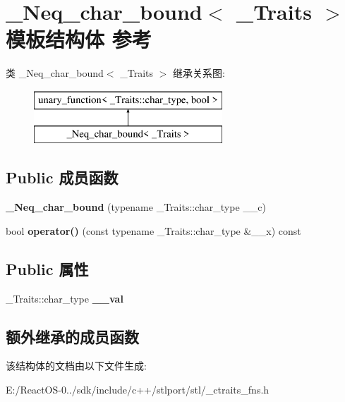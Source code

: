 \hypertarget{struct___neq__char__bound}{}\section{\+\_\+\+Neq\+\_\+char\+\_\+bound$<$ \+\_\+\+Traits $>$ 模板结构体 参考}
\label{struct___neq__char__bound}
类 \+\_\+\+Neq\+\_\+char\+\_\+bound$<$ \+\_\+\+Traits $>$ 继承关系图\+:\begin{figure}[H]
\begin{center}
\leavevmode
\includegraphics[height=2.000000cm]{struct___neq__char__bound}
\end{center}
\end{figure}
\subsection*{Public 成员函数}
\begin{DoxyCompactItemize}
\item 
\mbox{\label{struct___neq__char__bound_a9af7582cceb19b5851cd2db854e11588}} 
{\bfseries \+\_\+\+Neq\+\_\+char\+\_\+bound} (typename \+\_\+\+Traits\+::char\+\_\+type \+\_\+\+\_\+c)
\item 
\mbox{\label{struct___neq__char__bound_a248cd5253617213e5274f3c28bf143f2}} 
bool {\bfseries operator()} (const typename \+\_\+\+Traits\+::char\+\_\+type \&\+\_\+\+\_\+x) const
\end{DoxyCompactItemize}
\subsection*{Public 属性}
\begin{DoxyCompactItemize}
\item 
\mbox{\label{struct___neq__char__bound_a732f000a30561235ec1f98a92e38738a}} 
\+\_\+\+Traits\+::char\+\_\+type {\bfseries \+\_\+\+\_\+val}
\end{DoxyCompactItemize}
\subsection*{额外继承的成员函数}


该结构体的文档由以下文件生成\+:\begin{DoxyCompactItemize}
\item 
E\+:/\+React\+O\+S-\/0../sdk/include/c++/stlport/stl/\+\_\+ctraits\+\_\+fns.\+h\end{DoxyCompactItemize}
